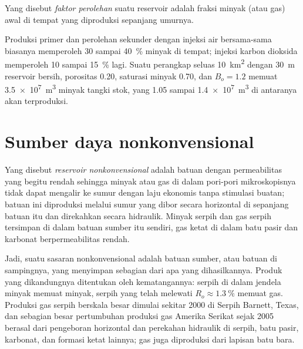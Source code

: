 \begin{definition}\label{def:b2:energy-geology:volumetrics}
Yang disebut \emph{faktor perolehan} suatu reservoir adalah fraksi minyak (atau gas)
awal di tempat yang diproduksi sepanjang umurnya.
\end{definition}

Produksi primer dan perolehan sekunder dengan injeksi air bersama-sama biasanya memperoleh 30 sampai \qty{40}{\percent} minyak di tempat; injeksi karbon
dioksida memperoleh 10 sampai \qty{15}{\percent} lagi. Suatu perangkap seluas \qty{10}{km^2} dengan \qty{30}{m} reservoir
bersih, porositas 0.20, saturasi minyak 0.70, dan $B_o = 1.2$ memuat \qty{3.5e7}{m^3} minyak tangki
stok, yang 1.05 sampai \qty{1.4e7}{m^3} di antaranya akan terproduksi.

\section{Sumber daya nonkonvensional}\label{sec:b2:energy-geology:unconventional}

\begin{definition}\label{def:b2:energy-geology:unconventional}
Yang disebut \emph{reservoir nonkonvensional} adalah batuan dengan
permeabilitas yang begitu rendah sehingga minyak atau gas di dalam pori-pori mikroskopisnya tidak dapat mengalir ke sumur dengan laju
ekonomis tanpa stimulasi buatan; batuan ini diproduksi melalui sumur yang dibor secara horizontal di sepanjang batuan itu dan
direkahkan secara hidraulik. Minyak serpih dan gas serpih tersimpan di dalam batuan sumber itu sendiri, gas ketat di dalam
batu pasir dan karbonat berpermeabilitas rendah.
\end{definition}

Jadi, suatu sasaran nonkonvensional adalah batuan sumber, atau batuan di sampingnya, yang menyimpan sebagian dari apa yang
dihasilkannya. Produk yang dikandungnya ditentukan oleh kematangannya: serpih di dalam jendela minyak memuat minyak,
serpih yang telah melewati $R_o \approx \qty{1.3}{\percent}$ memuat gas. Produksi gas serpih berskala besar dimulai sekitar
2000 di Serpih Barnett, Texas, dan sebagian besar pertumbuhan produksi gas Amerika Serikat sejak
2005 berasal dari pengeboran horizontal dan perekahan hidraulik di serpih, batu pasir, karbonat, dan
formasi ketat lainnya; gas juga diproduksi dari lapisan batu bara.


